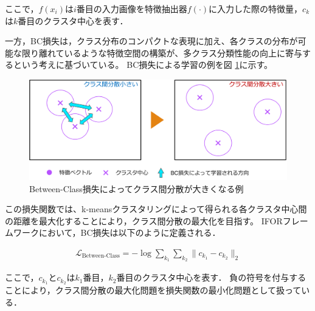 \documentclass[a4paper,11pt,nomag]{jsreport}
\begin{document}
\noindent
ここで，$f(x_i)$は$i$番目の入力画像を特徴抽出器$f(\cdot)$に入力した際の特徴量，$c_k$は$k$番目のクラスタ中心を表す．

一方，BC損失は，クラス分布のコンパクトな表現に加え、各クラスの分布が可能な限り離れているような特徴空間の構築が、多クラス分類性能の向上に寄与するという考えに基づいている。
BC損失による学習の例を図 \ref{fig:bc_loss}に示す。
% 
\begin{figure}[tbp]
  \centering
  \includegraphics[width=\linewidth, keepaspectratio]{image/bc_loss.png}
  \caption{Between-Class損失によってクラス間分散が大きくなる例}
  \label{fig:bc_loss}
\end{figure}
%
この損失関数では、k-meansクラスタリングによって得られる各クラスタ中心間の距離を最大化することにより，クラス間分散の最大化を目指す。
IFORフレームワークにおいて，BC損失は以下のように定義される．

\begin{align}
  \mathcal{L}_{\text{Between-Class}} = -\log{\sum_{k_1} {\sum_{k_2} {\lVert c_{k_1} - c_{k_2} \rVert_2}}}
\end{align}

\noindent
ここで，$c_{k_1}$と$c_{k_2}$は$k_1$番目，$k_2$番目のクラスタ中心を表す．
負の符号を付与することにより，クラス間分散の最大化問題を損失関数の最小化問題として扱っている．



\end{document}
